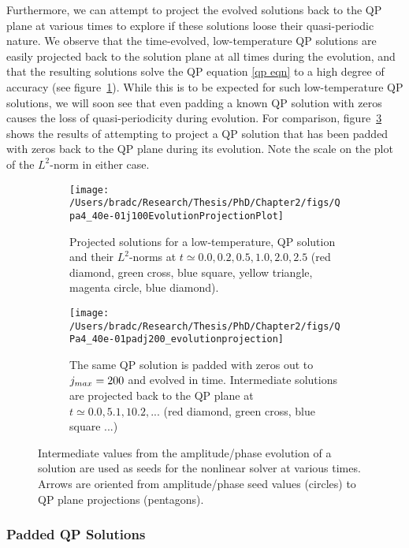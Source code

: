\documentclass[../PhD.tex]{subfiles}
\begin{document}
Furthermore, we can attempt to project the evolved solutions back to the QP plane at various times to explore if these solutions loose their quasi-periodic nature. We observe that the time-evolved, low-temperature QP solutions are easily projected back to the solution plane at all times during the evolution, and that the resulting solutions solve the QP equation \eqref{qp eqn} to a high degree of accuracy (see figure~\ref{fig: Qpa4_40e-01j100EvolutionProjection}). While this is to be expected for such low-temperature QP solutions, we will soon see that even padding a known QP solution with zeros causes the loss of quasi-periodicity during evolution. For comparison, figure~\ref{fig: QPa4_40e-01padj200_evolutionprojection} shows the results of attempting to project a QP solution that has been padded with zeros back to the QP plane during its evolution. Note the scale on the plot of the $L^2$-norm in either case.

\begin{figure}[h]
	\centering
	\begin{subfigure}[t]{0.45\textwidth}
		\texttt{[image: /Users/bradc/Research/Thesis/PhD/Chapter2/figs/Qpa4\_40e-01j100EvolutionProjectionPlot]}
		\caption{Projected solutions for a low-temperature, QP solution and their $L^2$-norms at $t\simeq 0.0, 0.2, 0.5, 1.0, 2.0, 2.5$ (red diamond, green cross, blue square, yellow triangle, magenta circle, blue diamond).}
		\label{fig: Qpa4_40e-01j100EvolutionProjection}
	\end{subfigure}
	\;
	\begin{subfigure}[t]{0.45\textwidth}
		\texttt{[image: /Users/bradc/Research/Thesis/PhD/Chapter2/figs/QPa4\_40e-01padj200\_evolutionprojection]}
		\caption{The same QP solution is padded with zeros out to $j_{max} = 200$ and evolved in time. Intermediate solutions are projected back to the QP plane at $t \simeq 0.0, 5.1, 10.2, ...$ (red diamond, green cross, blue square ...)}
		\label{fig: QPa4_40e-01padj200_evolutionprojection}
	\end{subfigure}
	\caption{Intermediate values from the amplitude/phase evolution of a solution are used as seeds for the nonlinear solver at various times. Arrows are oriented from amplitude/phase seed values (circles) to QP plane projections (pentagons).}
\end{figure}


\subsubsection{Padded QP Solutions}
\end{document}
